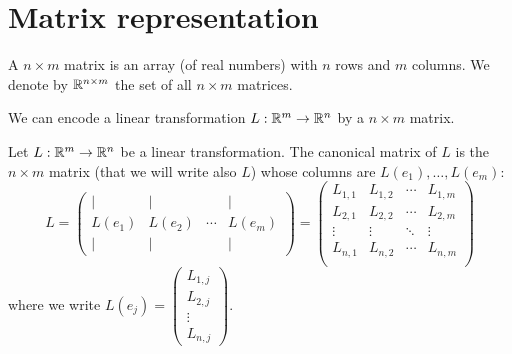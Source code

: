\documentclass[11pt,nocut]{article}
\begin{document}
\section{Matrix representation}


\begin{definition}
	A $n \times m$ matrix is an array (of real numbers) with $n$ rows and $m$ columns.
	We denote by $\mathbb{R}^{n \times m}$ the set of all $n \times m$ matrices.
\end{definition}

We can encode a linear transformation $L: \mathbb{R}^m \to \mathbb{R}^n$ by a $n \times m$ matrix.
\begin{definition}\label{def:canonical_matrix}
	Let $L: \mathbb{R}^m \to \mathbb{R}^n$ be a linear transformation.
	The canonical matrix of $L$ is the $n \times m$ matrix (that we will write also $L$) whose columns are $L(e_1), \dots, L(e_m)$:
	$$
	L =
	\begin{pmatrix}
		| & | & & | \\
		L(e_1) & L(e_2) & \cdots& L(e_m) \\
		| & | & & |
	\end{pmatrix}
	= 
	\begin{pmatrix}
		L_{1,1} & L_{1,2} & \cdots & L_{1,m} \\
		L_{2,1} & L_{2,2} & \cdots & L_{2,m} \\
		\vdots & \vdots & \ddots & \vdots \\
		L_{n,1} & L_{n,2} & \cdots & L_{n,m} \\
	\end{pmatrix}
	$$
	where we write $L(e_j) = 
	\begin{pmatrix}
		L_{1,j} \\
		L_{2,j}\\
		\vdots \\
		L_{n,j}
	\end{pmatrix}$.
\end{definition}
\end{document}
